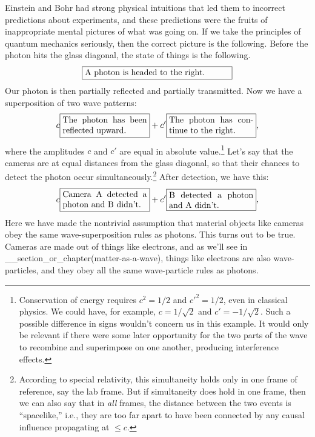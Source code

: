 Einstein and Bohr had strong physical intuitions that led them to
incorrect predictions about experiments, and these predictions were
the fruits of inappropriate mental pictures of what was going on. If we take
the principles of quantum mechanics seriously, then the correct picture
is the following. Before the photon hits the glass
diagonal, the state of things is the following.
\begin{equation*}
\fbox{\parbox{60mm}{A photon is headed to the right.}}
\end{equation*}
Our photon is then partially reflected and partially transmitted. Now we have
a superposition of two wave patterns:
\begin{equation*}
 c\fbox{\parbox{35mm}{The photon has been reflected upward.}}
+c'\fbox{\parbox{35mm}{The photon has continue to the right.}},
\end{equation*}
where the amplitudes $c$ and $c'$ are equal in absolute value.\footnote{
Conservation of energy requires $c^2=1/2$ and $c'^2=1/2$,
even in classical physics. We could have, for
example, $c=1/\sqrt{2}$ and $c'=-1/\sqrt{2}$. Such a possible difference in
signs wouldn't concern us in this example. It would only be relevant if there
were some later opportunity for the two parts of the wave to recombine and
superimpose on one another, producing interference effects.}
Let's say that the cameras are at equal distances from the glass diagonal,
so that their chances to detect the photon occur simultaneously.\footnote{
According to special relativity, this simultaneity holds only in one frame
of reference, say the lab frame. But if simultaneity does hold in one frame,
then we can also say that in \emph{all} frames, the distance between the two
events is ``spacelike,'' i.e., they are too far apart to have been connected
by any causal influence propagating at $\le c$.
}
After detection, we have this:
\begin{equation*}
 c\fbox{\parbox{35mm}{Camera A detected a photon and B didn't.}}
+c'\fbox{\parbox{35mm}{B detected a photon and A didn't.}},
\end{equation*}
Here we have made the nontrivial assumption that material objects like
cameras obey the same wave-superposition rules as photons. This turns out
to be true. Cameras are made out of things like electrons,
and as we'll see in __section_or_chapter(matter-as-a-wave), things like
electrons are also wave-particles, and they obey all the same wave-particle rules
as photons.

